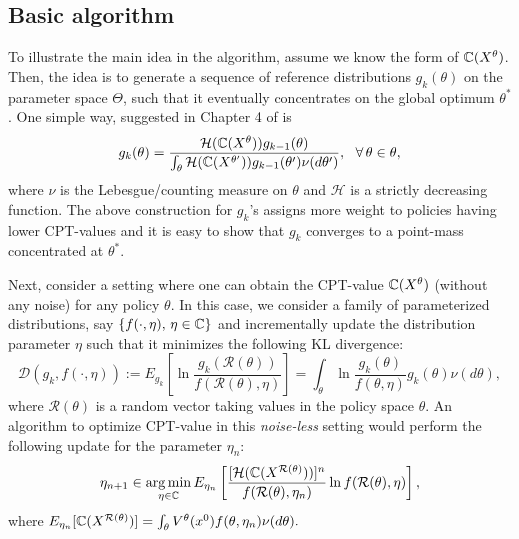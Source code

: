 \documentclass[11pt,letterpaper,english]{article}
\begin{document}
\subsection{Basic algorithm}
To illustrate the main idea in the algorithm, assume we know the form of $\mathbb{C}(X^\theta)$. Then, the idea is to generate a sequence of reference distributions $g_k(\theta)$ on the parameter space $\Theta$, such that it eventually concentrates on the global optimum $\theta^*$. One simple way, suggested in Chapter 4 of \cite{chang2013simulation} is
\begin{equation}
\label{eqn:naive}
g_{k}(\theta)=
\frac{\mathcal{H}(\mathbb{C}(X^\theta))g_{k-1}(\theta)}
{\int_{\theta}\mathcal{H}(\mathbb{C}(X^{\theta'}))g_{k-1}(\theta')\nu(d\theta')},
~~\forall\, \theta \in \theta,
\end{equation}
where $\nu$ is the Lebesgue/counting measure on $\theta$ and $\mathcal{H}$ is a strictly decreasing function. The above construction for $g_k$'s assigns more weight to policies having lower CPT-values and it is easy to show that $g_k$ converges to a point-mass concentrated at $\theta^*$.

Next, consider a setting where one can obtain the CPT-value $\mathbb{C}(X^\theta)$ (without any noise) for any policy $\theta$. In this case, we consider a family of parameterized distributions, say $\{f(\cdot,\eta),\,\eta\in \mathbb{C} \}$ and incrementally update the distribution parameter $\eta$ such that it minimizes the following KL divergence:
\begin{equation}\label{eqn:kl}
\mathcal{D}(g_k,f(\cdot,\eta)):=E_{g_k}\left[\ln \frac{g_{k}(\mathcal{R}(\theta))}{f(\mathcal{R}(\theta),\eta)}\right]=\int_{\theta} \ln \frac{g_{k}(\theta)}{f(\theta,\eta)}g_{k}(\theta)\nu(d\theta), \nonumber
\end{equation}
where $\mathcal{R}(\theta)$ is a random vector taking values in the policy space $\theta$. 
An algorithm to optimize CPT-value in this \textit{noise-less} setting would perform the following update for the parameter $\eta_n$:
\begin{equation}
\label{eqn:interior}
\eta_{n+1} \in \mathop{\rm arg\,min}_{\eta \in \mathbb{C}}
E_{\eta_n}\left[\frac{[\mathcal{H}(\mathbb{C}(X^{\mathcal{R}(\theta)}))]^{n}}
{f(\mathcal{R}(\theta),\eta_{n})}
\ln f(\mathcal{R}(\theta),\eta)\right],
\end{equation}
where $E_{\eta_n}[\mathbb{C}(X^{\mathcal{R}(\theta)})]=\int_{\theta} V^{\theta}(x^0)f(\theta,\eta_n)\nu(d\theta).$
\end{document}
